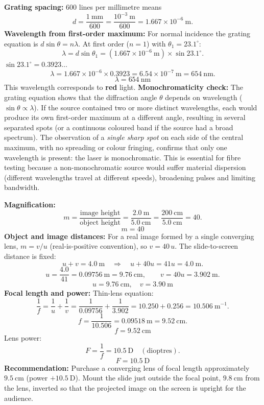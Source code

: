 \documentclass[11pt]{article}
\begin{document}
\begin{exoresolu}
\textbf{Grating spacing:} $600$ lines per millimetre means
\[
d = \frac{1\ \mathrm{mm}}{600} = \frac{10^{-3}\ \mathrm{m}}{600} = 1.667\times 10^{-6}\ \mathrm{m}.
\]
\textbf{Wavelength from first-order maximum:} For normal incidence the grating equation is $d\sin\theta = n\lambda$. At first order ($n=1$) with $\theta_1 = 23.1^\circ$:
\[
\lambda = d\sin\theta_1 = (1.667\times 10^{-6}\ \mathrm{m}) \times \sin 23.1^\circ.
\]
$\sin 23.1^\circ = 0.3923\ldots$
\[
\lambda = 1.667\times 10^{-6} \times 0.3923 = 6.54\times 10^{-7}\ \mathrm{m} = 654\ \mathrm{nm}.
\]
\[\boxed{\lambda = 654\ \mathrm{nm}}\]
This wavelength corresponds to \textbf{red} light.
\textbf{Monochromaticity check:} The grating equation shows that the diffraction angle $\theta$ depends on wavelength ($\sin\theta \propto \lambda$). If the source contained two or more distinct wavelengths, each would produce its own first-order maximum at a different angle, resulting in several separated spots (or a continuous coloured band if the source had a broad spectrum). The observation of a \emph{single sharp spot} on each side of the central maximum, with no spreading or colour fringing, confirms that only one wavelength is present: the laser is monochromatic. This is essential for fibre testing because a non-monochromatic source would suffer material dispersion (different wavelengths travel at different speeds), broadening pulses and limiting bandwidth.
\end{exoresolu}

\begin{exoresolu}
\textbf{Magnification:}
\[
m = \frac{\text{image height}}{\text{object height}} = \frac{2.0\ \mathrm{m}}{5.0\ \mathrm{cm}} = \frac{200\ \mathrm{cm}}{5.0\ \mathrm{cm}} = 40.
\]
\[\boxed{m = 40}\]
\textbf{Object and image distances:} For a real image formed by a single converging lens, $m = v/u$ (real-is-positive convention), so $v = 40\,u$. The slide-to-screen distance is fixed:
\[
u + v = 4.0\ \mathrm{m} \quad\Longrightarrow\quad u + 40u = 41u = 4.0\ \mathrm{m}.
\]
\[
u = \frac{4.0}{41} = 0.09756\ \mathrm{m} = 9.76\ \mathrm{cm}, \qquad
v = 40u = 3.902\ \mathrm{m}.
\]
\[\boxed{u = 9.76\ \mathrm{cm}}, \quad \boxed{v = 3.90\ \mathrm{m}}\]
\textbf{Focal length and power:} Thin-lens equation:
\[
\frac{1}{f} = \frac{1}{u} + \frac{1}{v} = \frac{1}{0.09756} + \frac{1}{3.902} = 10.250 + 0.256 = 10.506\ \mathrm{m^{-1}}.
\]
\[
f = \frac{1}{10.506} = 0.09518\ \mathrm{m} = 9.52\ \mathrm{cm}.
\]
\[\boxed{f = 9.52\ \mathrm{cm}}\]
Lens power:
\[
F = \frac{1}{f} = 10.5\ \mathrm{D} \quad (\text{dioptres}).
\]
\[\boxed{F = 10.5\ \mathrm{D}}\]
\textbf{Recommendation:} Purchase a converging lens of focal length approximately $9.5\ \mathrm{cm}$ (power $+10.5\ \mathrm{D}$). Mount the slide just outside the focal point, $9.8\ \mathrm{cm}$ from the lens, inverted so that the projected image on the screen is upright for the audience.
\end{exoresolu}
\end{document}
